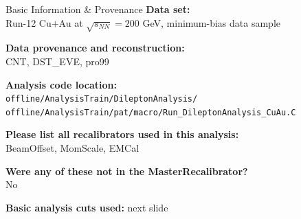 \documentclass[10pt, dvipsnames]{beamer}
\begin{document}
\begin{frame}{Basic Information \& Provenance}
\textbf{Data set:} \\
Run-12 Cu$+$Au at $\sqrt{s_{NN}}=200$ GeV, minimum-bias data sample \\
\vspace{0.4em}

\textbf{Data provenance and reconstruction:} \\
CNT, DST\_EVE, pro99 \\
\vspace{0.4em}

\textbf{Analysis code location:} \\
\texttt{offline/AnalysisTrain/DileptonAnalysis/} \\
\texttt{offline/AnalysisTrain/pat/macro/Run\_DileptonAnalysis\_CuAu.C} \\
\vspace{0.4em}

\textbf{Please list all recalibrators used in this analysis:} \\
BeamOffset, MomScale, EMCal \\
\vspace{0.4em}

\textbf{Were any of these not in the MasterRecalibrator?} \\
No \\
\vspace{0.4em}

\textbf{Basic analysis cuts used:} next slide
\end{frame}
\end{document}
